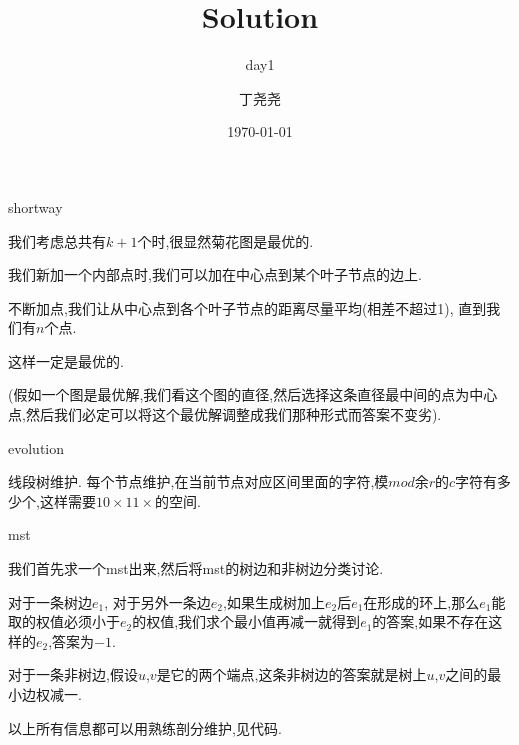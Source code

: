 \documentclass[11pt,serif]{beamer}
\begin{document}
	\author{丁尧尧}
	\title{Solution}
	\subtitle{day1}
	\date{\today}
	
	\begin{frame}[plain]
		\maketitle
	\end{frame}

	\begin{frame}{shortway}
		\begin{solution}
			我们考虑总共有$k+1$个时,很显然菊花图是最优的.
			
			我们新加一个内部点时,我们可以加在中心点到某个叶子节点的边上.
			
			不断加点,我们让从中心点到各个叶子节点的距离尽量平均(相差不超过1), 直到我们有$n$个点.
			
			这样一定是最优的. 
			
			(假如一个图是最优解,我们看这个图的直径,然后选择这条直径最中间的点为中心点,然后我们必定可以将这个最优解调整成我们那种形式而答案不变劣).
		\end{solution}
	\end{frame}

	\begin{frame}{evolution} 
		\begin{solution}
			线段树维护. 每个节点维护,在当前节点对应区间里面的字符,模$mod$余$r$的$c$字符有多少个,这样需要$10 \times 11 \times$的空间.
		\end{solution}	
	\end{frame}

	\begin{frame}{mst}
		\begin{solution}
			我们首先求一个mst出来,然后将mst的树边和非树边分类讨论.
			
			
			对于一条树边$e_1$, 对于另外一条边$e_2$,如果生成树加上$e_2$后$e_1$在形成的环上,那么$e_1$能取的权值必须小于$e_2$的权值,我们求个最小值再减一就得到$e_1$的答案,如果不存在这样的$e_2$,答案为$-1$.
			
			
			对于一条非树边,假设$u$,$v$是它的两个端点,这条非树边的答案就是树上$u$,$v$之间的最小边权减一.
			
			
			以上所有信息都可以用熟练剖分维护,见代码.
		\end{solution}
	\end{frame} 
\end{document}
